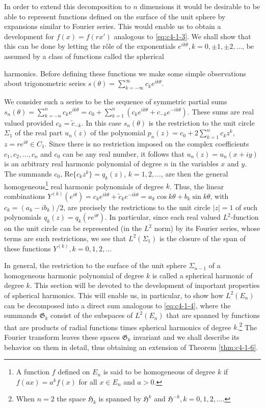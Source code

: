 In order to extend this decomposition to $n$ dimensions it would be desirable to be able to represent functions defined on the surface of the unit sphere by expansions similar to Fourier series. This would enable us to obtain a development for $f(x) = f(rx')$ analogous to \eqref{eq:c4-1-3}. We shall show that this can be done by letting the rôle of the exponentials $e^{ik\theta}, k = 0, \pm 1, \pm 2, \ldots$, be assumed by a class of functions called the spherical

harmonics. Before defining these functions we make some simple observations about trigonometric series $s(\theta) = \sum_{k=-\infty}^{\infty} c_k e^{ik\theta}$.

We consider such a series to be the sequence of symmetric partial sums $s_n(\theta) = \sum_{k=-n}^{n} c_k e^{ik\theta} = c_0 + \sum_{k=1}^{n} (c_k e^{ik\theta} + c_{-k} e^{-ik\theta})$. These sums are real valued provided $c_k = \tilde{c}_{-k}$. In this case $s_n(\theta)$ is the restriction to the unit circle $\Sigma_1$ of the real part $u_n(z)$ of the polynomial $p_n(z) = c_0 + 2\sum_{k=1}^{n} c_k z^k$, $z = re^{i\theta} \in C_1$. Since there is no restriction imposed on the complex coefficients $c_1, c_2, \ldots, c_n$ and $c_0$ can be any real number, it follows that $u_n(z) = u_n(x + iy)$ is an arbitrary real harmonic polynomial of degree $n$ in the variables $x$ and $y$. The summands $c_0$, $\text{Re}\{c_k z^{k}\} = q_k(z)$, $k=1,2,\ldots$, are then the general homogeneous\footnote{A function $f$ defined on $E_n$ is said to be homogeneous of degree $k$ if $f(ax) = a^k f(x)$ for all $x \in E_n$ and $a > 0$.} real harmonic polynomials of degree $k$. Thus, the linear combinations $Y^{(k)}(e^{i\theta}) = c_k e^{ik\theta} + \tilde{c}_k e^{-ik\theta} = a_k \cos k\theta + b_k \sin k\theta$, with $c_k = (a_k - ib_k)/2$, are precisely the restrictions to the unit circle $|z| = 1$ of such polynomials $q_k(z) = q_k(re^{i\theta})$. In particular, since each real valued $L^2$-function on the unit circle can be represented (in the $L^2$ norm) by its Fourier series, whose terms are such restrictions, we see that $L^2(\Sigma_1)$ is the closure of the span of these functions $Y^{(k)}, k=0,1,2,\ldots$

In general, the restriction to the surface of the unit sphere $\Sigma_{n-1}$ of a homogeneous harmonic polynomial of degree $k$ is called a spherical harmonic of degree $k$. This section will be devoted to the development of important properties of spherical harmonics. This will enable us, in particular, to show how $L^2(E_n)$ can be decomposed into a direct sum analogous to \eqref{eq:c4-1-4}, where the summands $\mathfrak{G}_k$ consist of the subspaces of $L^2(E_n)$ that are spanned by functions that are products of radial functions times spherical harmonics of degree $k$.\footnote{When $n = 2$ the space $\mathfrak{H}_{k}$ is spanned by $\mathfrak{H}^{k}$ and $\mathfrak{H}^{-k}, k = 0, 1, 2, \ldots$.} The Fourier transform leaves these spaces $\mathfrak{G}_k$ invariant and we shall describe its behavior on them in detail, thus obtaining an extension of Theorem \ref{thm:c4-1-6}.

